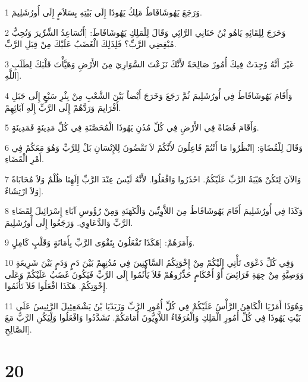 \par 1 وَرَجَعَ يَهُوشَافَاطُ مَلِكُ يَهُوذَا إِلَى بَيْتِهِ بِسَلاَمٍ إِلَى أُورُشَلِيمَ.
\par 2 وَخَرَجَ لِلِقَائِهِ يَاهُو بْنُ حَنَانِي الرَّائِي وَقَالَ لِلْمَلِكِ يَهُوشَافَاطَ: [أَتُسَاعِدُ الشِّرِّيرَ وَتُحِبُّ مُبْغِضِي الرَّبِّ؟ فَلِذَلِكَ الْغَضَبُ عَلَيْكَ مِنْ قِبَلِ الرَّبِّ.
\par 3 غَيْرَ أَنَّهُ وُجِدَتْ فِيكَ أُمُورٌ صَالِحَةٌ لأَنَّكَ نَزَعْتَ السَّوَارِيَ مِنَ الأَرْضِ وَهَيَّأْتَ قَلْبَكَ لِطَلَبِ اللَّهِ].
\par 4 وَأَقَامَ يَهُوشَافَاطُ فِي أُورُشَلِيمَ ثُمَّ رَجَعَ وَخَرَجَ أَيْضاً بَيْنَ الشَّعْبِ مِنْ بِئْرِ سَبْعٍ إِلَى جَبَلِ أَفْرَايِمَ وَرَدَّهُمْ إِلَى الرَّبِّ إِلَهِ آبَائِهِمْ.
\par 5 وَأَقَامَ قُضَاةً فِي الأَرْضِ فِي كُلِّ مُدُنِ يَهُوذَا الْمُحَصَّنَةِ فِي كُلِّ مَدِينَةٍ فَمَدِينَةٍ.
\par 6 وَقَالَ لِلْقُضَاةِ: [انْظُرُوا مَا أَنْتُمْ فَاعِلُونَ لأَنَّكُمْ لاَ تَقْضُونَ لِلإِنْسَانِ بَلْ لِلرَّبِّ وَهُوَ مَعَكُمْ فِي أَمْرِ الْقَضَاءِ.
\par 7 وَالآنَ لِتَكُنْ هَيْبَةُ الرَّبِّ عَلَيْكُمُ. احْذَرُوا وَافْعَلُوا. لأَنَّهُ لَيْسَ عِنْدَ الرَّبِّ إِلَهِنَا ظُلْمٌ وَلاَ مُحَابَاةٌ وَلاَ ارْتِشَاءٌ].
\par 8 وَكَذَا فِي أُورُشَلِيمَ أَقَامَ يَهُوشَافَاطُ مِنَ اللاَّوِيِّينَ وَالْكَهَنَةِ وَمِنْ رُؤُوسِ آبَاءِ إِسْرَائِيلَ لِقَضَاءِ الرَّبِّ وَالدَّعَاوِي. وَرَجَعُوا إِلَى أُورُشَلِيمَ.
\par 9 وَأَمَرَهُمْ: [هَكَذَا تَفْعَلُونَ بِتَقْوَى الرَّبِّ بِأَمَانَةٍ وَقَلْبٍ كَامِلٍ.
\par 10 وَفِي كُلِّ دَعْوَى تَأْتِي إِلَيْكُمْ مِنْ إِخْوَتِكُمُ السَّاكِنِينَ فِي مُدُنِهِمْ بَيْنَ دَمٍ وَدَمٍ بَيْنَ شَرِيعَةٍ وَوَصِيَّةٍ مِنْ جِهَةِ فَرَائِضَ أَوْ أَحْكَامٍ حَذِّرُوهُمْ فَلاَ يَأْثَمُوا إِلَى الرَّبِّ فَيَكُونَ غَضَبٌ عَلَيْكُمْ وَعَلَى إِخْوَتِكُمْ. هَكَذَا افْعَلُوا فَلاَ تَأْثَمُوا.
\par 11 وَهُوَذَا أَمَرْيَا الْكَاهِنُ الرَّأْسُ عَلَيْكُمْ فِي كُلِّ أُمُورِ الرَّبِّ وَزَبَدْيَا بْنُ يَشْمَعِئِيلَ الرَّئِيسُ عَلَى بَيْتِ يَهُوذَا فِي كُلِّ أُمُورِ الْمَلِكِ وَالْعُرَفَاءُ اللاَّوِيُّونَ أَمَامَكُمْ. تَشَدَّدُوا وَافْعَلُوا وَلِْيَكُنِ الرَّبُّ مَعَ الصَّالِحِ].

\chapter{20}

